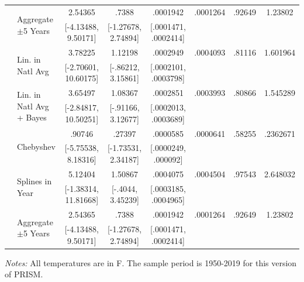 \begin{landscape}
\begin{table}[htb]
\begin{threeparttable}
{\begin{tabular}{llcccccc}
\\  & \multirow{2}{*}{Aggregate \(\pm\)5 Years} & 2.54365 & .7388 &  .0001942 & .0001264 & .92649 & 1.23802 \\  & & [-4.13488, 9.50171] & [-1.27678, 2.74894] & [.0001471, .0002414] & & \\  & \multirow{2}{*}{Lin. in Natl Avg} & 3.78225 & 1.12198 &  .0002949 & .0004093 & .81116 & 1.601964 \\  & & [-2.70601, 10.60175] & [-.86212, 3.15861] & [.0002101, .0003798] & & \\  & \multirow{2}{*}{Lin. in Natl Avg + Bayes} & 3.65497 & 1.08367 &  .0002851 & .0003993 & .80866 & 1.545289 \\  & & [-2.84817, 10.50251] & [-.91166, 3.12677] & [.0002013, .0003689] & & \\  & \multirow{2}{*}{Chebyshev} & .90746 & .27397 &  .0000585 & .0000641 & .58255 & .2362671 \\  & & [-5.75538, 8.18316] & [-1.73531, 2.34187] & [.0000249, .000092] & & \\  & \multirow{2}{*}{Splines in Year} & 5.12404 & 1.50867 &  .0004075 & .0004504 & .97543 & 2.648032 \\  & & [-1.38314, 11.81668] & [-.4044, 3.45239] & [.0003185, .0004965] & & \\  & \multirow{2}{*}{Aggregate \(\pm\)5 Years} & 2.54365 & .7388 &  .0001942 & .0001264 & .92649 & 1.23802 \\  & & [-4.13488, 9.50171] & [-1.27678, 2.74894] & [.0001471, .0002414] & & \\
\hline \hline
\end{tabular}
}
\begin{tablenotes}
\footnotesize \textit{Notes:} All temperatures are in \degree F. The sample period is 1950-2019 for this version of PRISM.
\end{tablenotes}
\end{threeparttable}
\end{table}
\end{landscape}
\restoregeometry
